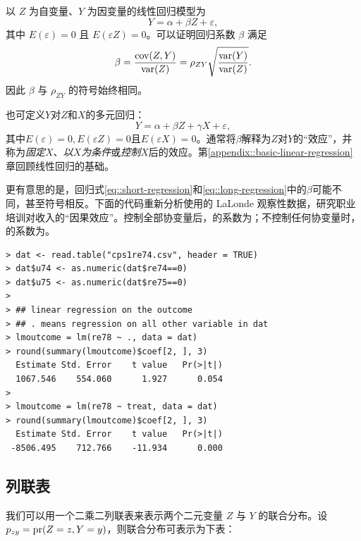 以 $Z$ 为自变量、$Y$ 为因变量的线性回归模型为 
\begin{equation}
Y = \alpha + \beta Z + \varepsilon ,
\label{eq::short-regression}
\end{equation} 
其中 $E(   \varepsilon  ) = 0$ 且 $E(   \varepsilon  Z ) = 0 $。可以证明回归系数 $\beta$ 满足  
 $$
 \beta = \frac{  \textup{cov}(Z, Y)   }{   \textup{var}(Z)    }  = \rho_{ZY}   \sqrt{     \frac{  \textup{var}(Y)     }{ \textup{var}(Z)  }    }  . 
 $$
 因此 $\beta$ 与 $\rho_{ZY} $ 的符号始终相同。 
 
 
也可定义$Y$对$Z$和$X$的多元回归：
\begin{equation}
 Y = \alpha  + \beta Z + \gamma  X + \varepsilon ,
 \label{eq::long-regression}
\end{equation}
其中$E( \varepsilon) = 0, E( \varepsilon Z) = 0$且$ E( \varepsilon X) = 0$。通常将$\beta$解释为$Z$对$Y$的“效应”，并称为{\it 固定$X$}、{\it 以$X$为条件}或{\it 控制$X$}后的效应。第\ref{appendix::basic-linear-regression}章回顾线性回归的基础。 

 

更有意思的是，回归式\eqref{eq::short-regression}和\eqref{eq::long-regression}中的$\beta$可能不同，甚至符号相反。下面的代码重新分析\citet{hainmueller2012entropy}使用的 LaLonde 观察性数据，研究职业培训对收入的“因果效应”。控制全部协变量后，的系数为；不控制任何协变量时，的系数为。 


\begin{lstlisting}
> dat <- read.table("cps1re74.csv", header = TRUE)
> dat$u74 <- as.numeric(dat$re74==0)
> dat$u75 <- as.numeric(dat$re75==0)
> 
> ## linear regression on the outcome
> ## . means regression on all other variable in dat
> lmoutcome = lm(re78 ~ ., data = dat)
> round(summary(lmoutcome)$coef[2, ], 3)
  Estimate Std. Error    t value   Pr(>|t|) 
  1067.546    554.060      1.927      0.054 
> 
> lmoutcome = lm(re78 ~ treat, data = dat)
> round(summary(lmoutcome)$coef[2, ], 3)
  Estimate Std. Error    t value   Pr(>|t|) 
 -8506.495    712.766    -11.934      0.000 
\end{lstlisting} 



 
 
 \subsection{列联表}
 \label{sec::twobytwotables-withresume}
 
 我们可以用一个二乘二列联表来表示两个二元变量 $Z$ 与 $Y$ 的联合分布。设 $p_{zy} = \textup{pr}( Z=z, Y=y )$，则联合分布可表示为下表：
 
